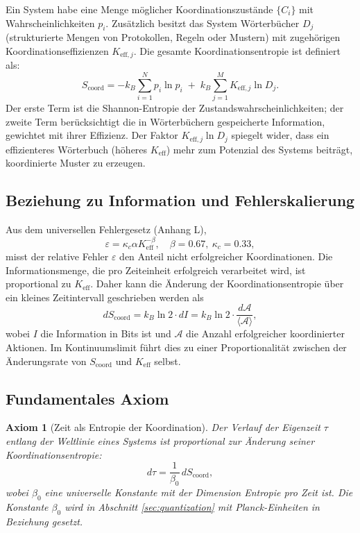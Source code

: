 \documentclass[12pt,a4paper]{article}
\newtheorem{axiom}[theorem]{Axiom}
\newcommand{\Keff}{K_{\mathrm{eff}}}
\newcommand{\Keffi}[1]{K_{\mathrm{eff},#1}}
\newcommand{\kappac}{\kappa_c}
\newcommand{\Scoord}{S_{\mathrm{coord}}}
\begin{document}
	Ein System habe eine Menge möglicher Koordinationszustände \(\{C_i\}\) mit Wahrscheinlichkeiten \(p_i\). Zusätzlich besitzt das System Wörterbücher \(D_j\) (strukturierte Mengen von Protokollen, Regeln oder Mustern) mit zugehörigen Koordinationseffizienzen \(\Keffi{j}\). Die gesamte Koordinationsentropie ist definiert als:
	\begin{equation}
		\Scoord = -k_B \sum_{i=1}^{N} p_i \ln p_i \;+\; k_B \sum_{j=1}^{M} \Keffi{j} \ln D_j.
		\label{eq:coord_entropy_def}
	\end{equation}
	Der erste Term ist die Shannon-Entropie der Zustandswahrscheinlichkeiten; der zweite Term berücksichtigt die in Wörterbüchern gespeicherte Information, gewichtet mit ihrer Effizienz. Der Faktor \(\Keffi{j} \ln D_j\) spiegelt wider, dass ein effizienteres Wörterbuch (höheres \(\Keff\)) mehr zum Potenzial des Systems beiträgt, koordinierte Muster zu erzeugen.
	
	\subsection{Beziehung zu Information und Fehlerskalierung}
	
	Aus dem universellen Fehlergesetz (Anhang L),
	\begin{equation}
		\varepsilon = \kappac \alpha \Keff^{-\beta}, \quad \beta = 0.67,\ \kappac = 0.33,
	\end{equation}
	misst der relative Fehler \(\varepsilon\) den Anteil nicht erfolgreicher Koordinationen. Die Informationsmenge, die pro Zeiteinheit erfolgreich verarbeitet wird, ist proportional zu \(\Keff\). Daher kann die Änderung der Koordinationsentropie über ein kleines Zeitintervall geschrieben werden als
	\begin{equation}
		d\Scoord = k_B \ln 2 \cdot dI = k_B \ln 2 \cdot \frac{d\mathcal{A}}{\langle \mathcal{A} \rangle},
	\end{equation}
	wobei \(I\) die Information in Bits ist und \(\mathcal{A}\) die Anzahl erfolgreicher koordinierter Aktionen. Im Kontinuumslimit führt dies zu einer Proportionalität zwischen der Änderungsrate von \(\Scoord\) und \(\Keff\) selbst.
	
	\subsection{Fundamentales Axiom}
	
	\begin{axiom}[Zeit als Entropie der Koordination]
		Der Verlauf der Eigenzeit \(\tau\) entlang der Weltlinie eines Systems ist proportional zur Änderung seiner Koordinationsentropie:
		\begin{equation}
			d\tau = \frac{1}{\beta_0} \, d\Scoord,
			\label{eq:time_entropy}
		\end{equation}
		wobei \(\beta_0\) eine universelle Konstante mit der Dimension Entropie pro Zeit ist. Die Konstante \(\beta_0\) wird in Abschnitt \ref{sec:quantization} mit Planck-Einheiten in Beziehung gesetzt.
	\end{axiom}
	
\end{document}
